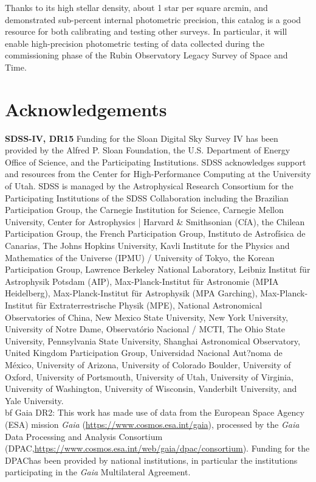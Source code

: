 \documentclass[fleqn,usenatbib]{mnras}
\begin{document}
Thanks to its high stellar density, about 1 star per square arcmin, and demonstrated sub-percent 
internal photometric precision, this catalog is a good resource for both calibrating and testing 
other surveys. In particular, it will enable high-precision photometric testing of data collected 
during the commissioning phase of the Rubin Observatory Legacy Survey of Space and Time. 

\section*{Acknowledgements}

{\bf SDSS-IV, DR15} Funding for the Sloan Digital Sky Survey IV has been provided by the Alfred P. Sloan Foundation, the U.S. Department of Energy Office of Science, and the Participating Institutions. SDSS acknowledges support and resources from the Center for High-Performance Computing at the University of Utah. SDSS is managed by the Astrophysical Research Consortium for the Participating Institutions of the SDSS Collaboration including the Brazilian Participation Group, the Carnegie Institution for Science, Carnegie Mellon University, Center for Astrophysics | Harvard \& Smithsonian (CfA), the Chilean Participation Group, the French Participation Group, Instituto de Astrof{\'i}sica de Canarias, The Johns Hopkins University, Kavli Institute for the Physics and Mathematics of the Universe (IPMU) / University of Tokyo, the Korean Participation Group, Lawrence Berkeley National Laboratory, Leibniz Institut f{\"u}r Astrophysik Potsdam (AIP), Max-Planck-Institut f{\"u}r Astronomie (MPIA Heidelberg), Max-Planck-Institut f{\"u}r Astrophysik (MPA Garching), Max-Planck-Institut f{\"u}r Extraterrestrische Physik (MPE), National Astronomical Observatories of China, New Mexico State University, New York University, University of Notre Dame, Observat{\'o}rio Nacional / MCTI, The Ohio State University, Pennsylvania State University, Shanghai Astronomical Observatory, United Kingdom Participation Group, Universidad Nacional Aut?noma de M{\'e}xico, University of Arizona, University of Colorado Boulder, University of Oxford, University of Portsmouth, University of Utah, University of Virginia, University of Washington, University of Wisconsin, Vanderbilt University, and Yale University. \\
{bf Gaia DR2}: This work has made use of data from the European Space Agency (ESA) mission {\it Gaia} (\url{https://www.cosmos.esa.int/gaia}), processed by the {\it Gaia} Data Processing and Analysis Consortium (DPAC,\url{https://www.cosmos.esa.int/web/gaia/dpac/consortium}). Funding for the DPAChas been provided by national institutions, in particular the institutions participating in the {\it Gaia} Multilateral Agreement.\\
\end{document}
